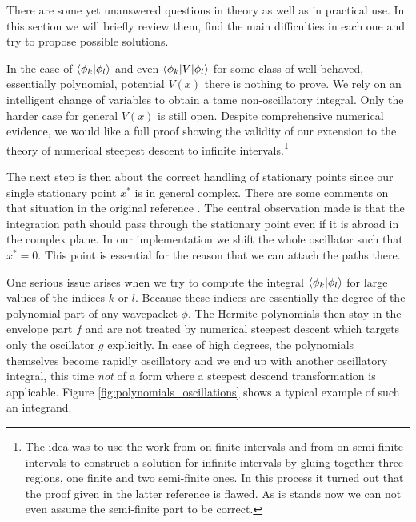 \documentclass[a4paper,10pt]{article}
\begin{document}
There are some yet unanswered questions in theory as well as in practical use.
In this section we will briefly review them, find the main difficulties
in each one and try to propose possible solutions.

In the case of $\braket{\phi_k | \phi_l}$ and even $\braket{\phi_k | V | \phi_l}$
for some class of well-behaved, essentially polynomial, potential $V(x)$ there is
nothing to prove. We rely on an intelligent change of variables to obtain a tame
non-oscillatory integral. Only the harder case for general $V(x)$ is still open.
Despite comprehensive numerical evidence, we would like a full proof showing the
validity of our extension to the theory of numerical steepest descent to infinite
intervals.\footnote{The idea was to use the work from \cite{HV_hoq}
on finite intervals and from \cite{H_nsd_sii} on semi-finite intervals
to construct a solution for infinite intervals by gluing together three regions,
one finite and two semi-finite ones. In this process it turned out that the proof
given in the latter reference is flawed. As is stands now we can not even assume
the semi-finite part to be correct.}

The next step is then about the correct handling of stationary points since our
single stationary point $x^{*}$ is in general complex. There are some comments on
that situation in the original reference \cite{HV_hoq}. The central observation made is that
the integration path should pass through the stationary point even if it is abroad
in the complex plane. In our implementation we shift the whole oscillator such that
$x^{*} = 0$. This point is essential for the reason that we can attach the paths there.

One serious issue arises when we try to compute the integral $\braket{\phi_k|\phi_l}$
for large values of the indices $k$ or $l$. Because these indices are essentially the
degree of the polynomial part of any wavepacket $\phi$. The Hermite polynomials then
stay in the envelope part $f$ and are not treated by numerical steepest descent which
targets only the oscillator $g$ explicitly. In case of high degrees, the polynomials
themselves become rapidly oscillatory and we end up with another oscillatory integral,
this time \emph{not} of a form where a steepest descend transformation is applicable.
Figure \ref{fig:polynomials_oscillations} shows a typical example of such an integrand.
\end{document}
